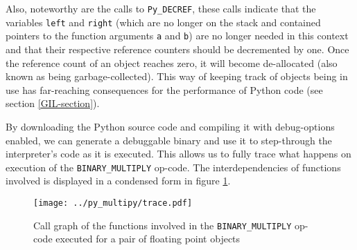 \documentclass[english,11pt,a4paper,table]{article} %
\begin{document}

Also, noteworthy are the calls to \texttt{Py\_DECREF}, these calls indicate that the variables \texttt{left} and \texttt{right} (which are no longer on the stack and contained pointers to the function arguments \texttt{a} and \texttt{b}) are no longer needed in this context and that their respective reference counters should be decremented by one.
Once the reference count of an object reaches zero, it will become de-allocated (also known as being garbage-collected).
This way of keeping track of objects being in use has far-reaching consequences for the performance of Python code (see section \ref{GIL-section}).

By downloading the Python source code and compiling it with debug-options enabled, we can generate a debuggable binary and use it to step-through the interpreter's code as it is executed.
This allows us to fully trace what happens on execution of the \texttt{BINARY\_MULTIPLY} op-code.
The interdependencies of functions involved is displayed in a condensed form in figure \ref{py_mult_trace}.

\begin{figure}[H]
	\texttt{[image: ../py\_multipy/trace.pdf]}
	\caption{Call graph of the functions involved in the \texttt{BINARY\_MULTIPLY} op-code executed for a pair of floating point objects}
	\label{py_mult_trace}
\end{figure}
\end{document}
